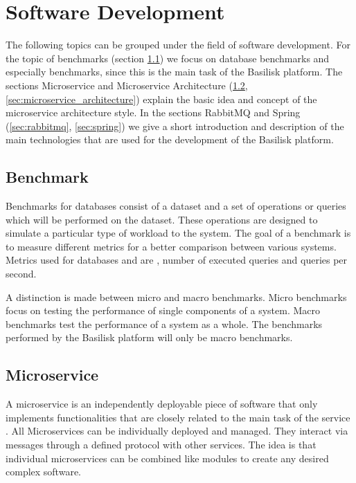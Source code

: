 \section{Software Development}
\label{sec:software_dev}
The following topics can be grouped under the field of software development.
For the topic of benchmarks (section \ref{sec:benchmark}) we focus on database benchmarks and especially \ts{} benchmarks, since this is the main task of the Basilisk platform.
The sections Microservice and Microservice Architecture (\ref{sec:microservice}, \ref{sec:microservice_architecture}) explain the basic idea and concept of the microservice architecture style.
In the sections RabbitMQ and Spring (\ref{sec:rabbitmq}, \ref{sec:spring}) we give a short introduction and description of the main technologies that are used for the development of the Basilisk platform.

\subsection{Benchmark}
\label{sec:benchmark}
Benchmarks for databases consist of a dataset and a set of operations or queries which will be performed on the dataset.
These operations are designed to simulate a particular type of workload to the system.
The goal of a benchmark is to measure different metrics for a better comparison between various systems.
Metrics used for databases and \tsp{} are \eg, number of executed queries and queries per second\cite{IguanaDocumentationMetrics}.

A distinction is made between micro and macro benchmarks.
Micro benchmarks focus on testing the performance of single components of a system.
Macro benchmarks test the performance of a system as a whole.
The benchmarks performed by the Basilisk platform will only be macro benchmarks.

\subsection{Microservice}
\label{sec:microservice}
A microservice is an independently deployable piece of software that only implements functionalities that are closely related to the main task of the service \cite{dragoniMicroservicesYesterdayToday2017}.
All Microservices can be individually deployed and managed.
They interact via messages through a defined protocol with other services.
The idea is that individual microservices can be combined like modules to create any desired complex software.

